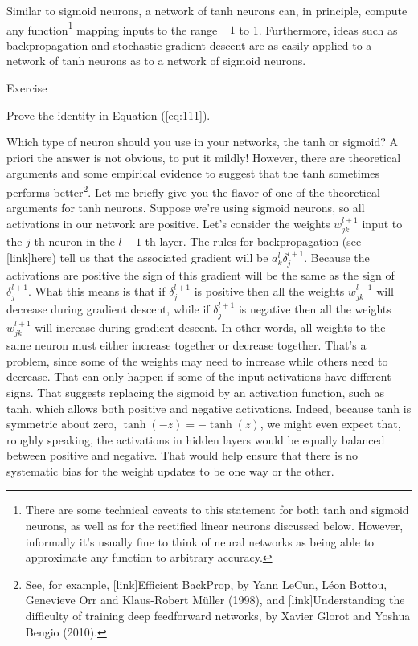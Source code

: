 \documentclass[a4paper,twoside,10pt]{book}
\begin{document}
Similar to sigmoid neurons, a network of tanh neurons can, in principle, compute any function\footnote{There are some technical caveats to this statement for both tanh and sigmoid neurons, as well as for the rectified linear neurons discussed below. However, informally it's usually fine to think of neural networks as being able to approximate any function to arbitrary accuracy.} mapping inputs to the range $-1$ to 1. Furthermore, ideas such as backpropagation and stochastic gradient descent are as easily applied to a network of tanh neurons as to a network of sigmoid neurons.

\begin{exercize}{Exercise}
	\item Prove the identity in Equation (\ref{eq:111}).
\end{exercize}
Which type of neuron should you use in your networks, the tanh or sigmoid? A priori the answer is not obvious, to put it mildly! However, there are theoretical arguments and some empirical evidence to suggest that the tanh sometimes performs better\footnote{See, for example, [link]Efficient BackProp, by Yann LeCun, L\'eon Bottou, Genevieve Orr and Klaus-Robert M\"uller (1998), and [link]Understanding the difficulty of training deep feedforward networks, by Xavier Glorot and Yoshua Bengio (2010).}. Let me briefly give you the flavor of one of the theoretical arguments for tanh neurons. Suppose we're using sigmoid neurons, so all activations in our network are positive. Let's consider the weights $w^{l+1}_{jk}$ input to the $j$-th neuron in the $l+1$-th layer. The rules for backpropagation (see [link]here) tell us that the associated gradient will be $a^l_k\delta^{l+1}_{j}$. Because the activations are positive the sign of this gradient will be the same as the sign of $\delta^{l+1}_{j}$. What this means is that if $\delta^{l+1}_{j}$ is positive then all the weights $w^{l+1}_{jk}$ will decrease during gradient descent, while if $\delta^{l+1}_{j}$ is negative then all the weights $w^{l+1}_{jk}$ will increase during gradient descent. In other words, all weights to the same neuron must either increase together or decrease together. That's a problem, since some of the weights may need to increase while others need to decrease. That can only happen if some of the input activations have different signs. That suggests replacing the sigmoid by an activation function, such as tanh, which allows both positive and negative activations. Indeed, because tanh is symmetric about zero, $\tanh(-z)=-\tanh(z)$, we might even expect that, roughly speaking, the activations in hidden layers would be equally balanced between positive and negative. That would help ensure that there is no systematic bias for the weight updates to be one way or the other.
\end{document}
